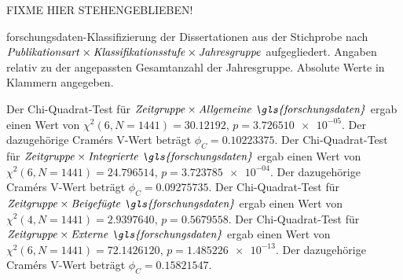 FIXME HIER STEHENGEBLIEBEN!

\begin{table}[!htbp]
	\caption{\gls{forschungsdaten}-Klassifizierung der Dissertationen aus der Stichprobe nach $\text{\textit{Publikationsart}}\times\text{\textit{Klassifikationsstufe}}\times\text{\textit{Jahresgruppe}}$ aufgegliedert.
    Angaben relativ zu der angepassten Gesamtanzahl der Jahresgruppe.
    Absolute Werte in Klammern angegeben.}
    
    \label{tab:luh-repo-classification-general-publication-adjusted}
\end{table}

Der Chi-Quadrat-Test für $\text{\textit{Zeitgruppe}}\times\text{\textit{Allgemeine \gls{forschungsdaten}}}$ ergab einen Wert von $\chi^2 (\num{6}, N = \num{1441}) = \num[round-mode=places,round-precision=3]{30.12192}$, $p = \num[round-mode=places,round-precision=3]{3.726510e-05}$.
Der dazugehörige Cramérs V-Wert beträgt $\phi_C=\num[round-mode=places,round-precision=3]{0.10223375}$.
Der Chi-Quadrat-Test für $\text{\textit{Zeitgruppe}}\times\text{\textit{Integrierte \gls{forschungsdaten}}}$ ergab einen Wert von $\chi^2 (\num{6}, N = \num{1441}) = \num[round-mode=places,round-precision=3]{24.796514}$, $p = \num[round-mode=places,round-precision=3]{3.723785e-04}$.
Der dazugehörige Cramérs V-Wert beträgt $\phi_C=\num[round-mode=places,round-precision=3]{0.09275735}$.
Der Chi-Quadrat-Test für $\text{\textit{Zeitgruppe}}\times\text{\textit{Beigefügte \gls{forschungsdaten}}}$ ergab einen Wert von $\chi^2 (\num{4}, N = \num{1441}) = \num[round-mode=places,round-precision=3]{2.9397640}$, $p = \num[round-mode=places,round-precision=3]{0.5679558}$.
Der Chi-Quadrat-Test für $\text{\textit{Zeitgruppe}}\times\text{\textit{Externe \gls{forschungsdaten}}}$ ergab einen Wert von $\chi^2 (\num{6}, N = \num{1441}) = \num[round-mode=places,round-precision=3]{72.1426120}$, $p = \num[round-mode=places,round-precision=3]{1.485226e-13}$.
Der dazugehörige Cramérs V-Wert beträgt $\phi_C=\num[round-mode=places,round-precision=3]{0.15821547}$.


